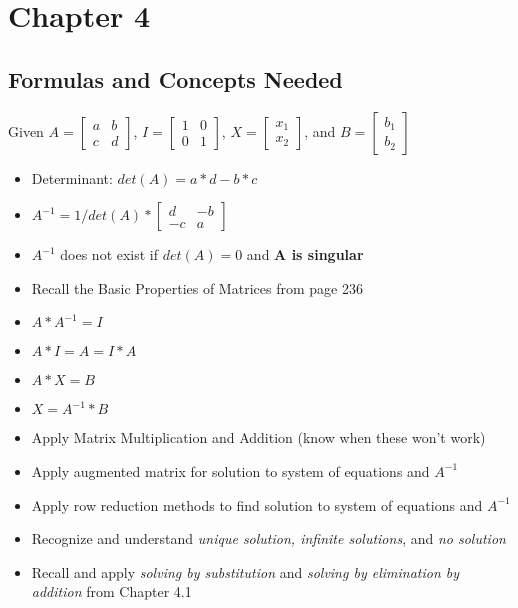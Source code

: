 \documentclass[14pt]{extarticle}
\begin{document}
\section*{Chapter 4}
\subsection*{Formulas  and Concepts Needed}
Given $A = \begin{bmatrix}
	a & b \\
	c & d
\end{bmatrix}$, $I = \begin{bmatrix}
	1 & 0 \\
	0 & 1
\end{bmatrix}$, $X = \begin{bmatrix}
	x_1 \\
	x_2
\end{bmatrix}$, and $B = \begin{bmatrix}
	b_1 \\
	b_2
\end{bmatrix}
$

\begin{itemize}
	\item Determinant: $det(A) = a*d - b*c$
	\item $A^{-1} = 1/det(A) * \begin{bmatrix}
		d & -b \\
		-c & a
	\end{bmatrix}$
	\item $A^{-1}$ does not exist if $det(A)=0$ and \textbf{A is singular}
	\item Recall the Basic Properties of Matrices from page 236
	\item $A * A^{-1} = I$
	\item $A * I = A = I*A$
	\item $A*X = B$
	\item $X = A^{-1}*B$
	\item Apply Matrix Multiplication and Addition (know when these won't work)
	\item Apply augmented matrix for solution to system of equations and $A^{-1}$
	\item Apply row reduction methods to find solution to system of equations and $A^{-1}$
	\item Recognize and understand \textit{unique solution, infinite solutions}, and \textit{no solution}
	\item Recall and apply \textit{solving by substitution} and \textit{solving by elimination by addition} from Chapter 4.1
\end{itemize}	
\end{document}
